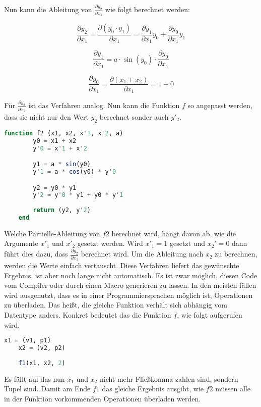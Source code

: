 Nun kann die Ableitung von $\frac{\partial y_2}{\partial x_1}$ wie folgt berechnet werden:

$$
	\frac{\partial y_2}{\partial x_1} = \frac{\partial (y_0 \cdot y_1)}{\partial x_1} = \frac{\partial  y_1}{\partial x_1} y_0  + \frac{\partial y_0 }{\partial x_1} y_1
$$

$$
	\frac{\partial y_1}{ \partial x_1 } = a \cdot \sin(y_0) \cdot \frac{\partial y_0}{\partial x_1}
$$

$$
	\frac{\partial y_0}{\partial x_1} = \frac{\partial (x_1 + x_2)}{\partial x_1} = 1 + 0
$$

Für $\frac{\partial y_2}{\partial x_2}$ ist das Verfahren analog. 
Nun kann die Funktion $f$ so angepasst werden, dass sie nicht nur den Wert $y_2$ berechnet sonder auch $y'_2$.

\begin{lstlisting}[language=Julia]
    function f2 (x1, x2, x'1, x'2, a)
        y0 = x1 + x2
        y'0 = x'1 + x'2

        y1 = a * sin(y0)
        y'1 = a * cos(y0) * y'0

		y2 = y0 * y1
        y'2 = y'0 * y1 + y0 * y'1
        
        return (y2, y'2)
    end
\end{lstlisting}

Welche Partielle-Ableitung von $f2$ berechnet wird, hängt davon ab, wie die Argumente $x'_1$ und $x'_2$ gesetzt werden.
Wird $x'_1 = 1$ gesetzt und $x_2' = 0$ dann führt dies dazu, dass $\frac{\partial y_2}{\partial x_1}$ berechnet wird.
Um die Ableitung nach $x_2$ zu berechnen, werden die Werte einfach vertauscht.
Diese Verfahren liefert das gewünschte Ergebnis, ist aber noch lange nicht automatisch.
Es ist zwar möglich, diesen Code vom Compiler oder durch einen Macro generieren zu lassen.
In den meisten fällen wird ausgenutzt, dass es in einer 
Programmiersprachen möglich ist, Operationen zu überladen.
Das heißt, die gleiche Funktion verhält sich abhängig vom Datentype anders.
Konkret bedeutet das die Funktion $f$, wie folgt aufgerufen wird.

\begin{lstlisting}[language=Julia]
	x1 = (v1, p1)
    x2 = (v2, p2)
    
    f1(x1, x2, 2)
\end{lstlisting}

Es fällt auf das nun $x_1$ und $x_2$ nicht mehr Fließkomma zahlen sind, sondern Tupel sind.
Damit am Ende $f1$ das gleiche Ergebnis ausgibt, wie $f2$ müssen alle in der Funktion vorkommenden Operationen überladen werden.

